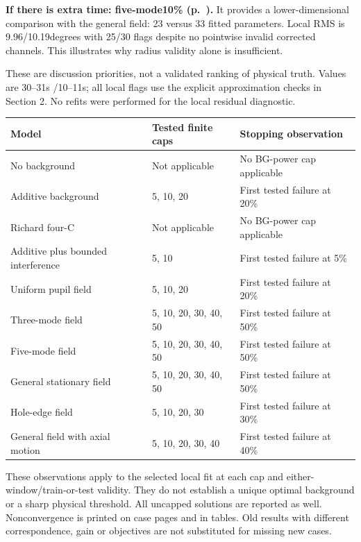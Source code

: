 \documentclass[10pt,a4paper]{article}
\begin{document}
\textbf{If there is extra time: five-mode10\% (p.~\pageref{case:five:10pct}).} It provides a lower-dimensional comparison with the general field: 23 versus 33 fitted parameters. Local RMS is 9.96/10.19degrees with 25/30 flags despite no pointwise invalid corrected channels. This illustrates why radius validity alone is insufficient.

These are discussion priorities, not a validated ranking of physical truth. Values are 30--31s /10--11s; all local flags use the explicit approximation checks in Section 2. No refits were performed for the local residual diagnostic.
\newpage
\begin{longtable}{p{52mm}p{35mm}p{70mm}}\toprule
Model & Tested finite caps & Stopping observation\\\midrule\endhead
No background & Not applicable & No BG-power cap applicable\\
Additive background & 5, 10, 20 & First tested failure at 20\%\\
Richard four-C & Not applicable & No BG-power cap applicable\\
Additive plus bounded interference & 5, 10 & First tested failure at 5\%\\
Uniform pupil field & 5, 10, 20 & First tested failure at 20\%\\
Three-mode field & 5, 10, 20, 30, 40, 50 & First tested failure at 50\%\\
Five-mode field & 5, 10, 20, 30, 40, 50 & First tested failure at 50\%\\
General stationary field & 5, 10, 20, 30, 40, 50 & First tested failure at 50\%\\
Hole-edge field & 5, 10, 20, 30 & First tested failure at 30\%\\
General field with axial motion & 5, 10, 20, 30, 40 & First tested failure at 40\%\\
\bottomrule\end{longtable}
These observations apply to the selected local fit at each cap and either-window/train-or-test validity. They do not establish a unique optimal background or a sharp physical threshold. All uncapped solutions are reported as well. Nonconvergence is printed on case pages and in tables. Old results with different correspondence, gain or objectives are not substituted for missing new cases.
\newpage
\end{document}
